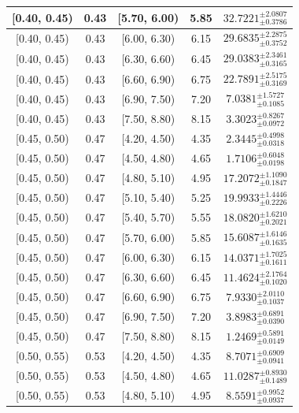 \begin{longtable}{|c|c|c|c|c|}
\hline
[0.40, 0.45) & 0.43 & [5.70, 6.00) & 5.85 & $32.7221^{ \pm 2.0807 }_{ \pm 0.3786 }$ \\ 
\hline
[0.40, 0.45) & 0.43 & [6.00, 6.30) & 6.15 & $29.6835^{ \pm 2.2875 }_{ \pm 0.3752 }$ \\ 
\hline
[0.40, 0.45) & 0.43 & [6.30, 6.60) & 6.45 & $29.0383^{ \pm 2.3461 }_{ \pm 0.3165 }$ \\ 
\hline
[0.40, 0.45) & 0.43 & [6.60, 6.90) & 6.75 & $22.7891^{ \pm 2.5175 }_{ \pm 0.3169 }$ \\ 
\hline
[0.40, 0.45) & 0.43 & [6.90, 7.50) & 7.20 & $7.0381^{ \pm 1.5727 }_{ \pm 0.1085 }$ \\ 
\hline
[0.40, 0.45) & 0.43 & [7.50, 8.80) & 8.15 & $3.3023^{ \pm 0.8267 }_{ \pm 0.0972 }$ \\ 
\hline
[0.45, 0.50) & 0.47 & [4.20, 4.50) & 4.35 & $2.3445^{ \pm 0.4998 }_{ \pm 0.0318 }$ \\ 
\hline
[0.45, 0.50) & 0.47 & [4.50, 4.80) & 4.65 & $1.7106^{ \pm 0.6048 }_{ \pm 0.0198 }$ \\ 
\hline
[0.45, 0.50) & 0.47 & [4.80, 5.10) & 4.95 & $17.2072^{ \pm 1.1090 }_{ \pm 0.1847 }$ \\ 
\hline
[0.45, 0.50) & 0.47 & [5.10, 5.40) & 5.25 & $19.9933^{ \pm 1.4446 }_{ \pm 0.2226 }$ \\ 
\hline
[0.45, 0.50) & 0.47 & [5.40, 5.70) & 5.55 & $18.0820^{ \pm 1.6210 }_{ \pm 0.2021 }$ \\ 
\hline
[0.45, 0.50) & 0.47 & [5.70, 6.00) & 5.85 & $15.6087^{ \pm 1.6146 }_{ \pm 0.1635 }$ \\ 
\hline
[0.45, 0.50) & 0.47 & [6.00, 6.30) & 6.15 & $14.0371^{ \pm 1.7025 }_{ \pm 0.1611 }$ \\ 
\hline
[0.45, 0.50) & 0.47 & [6.30, 6.60) & 6.45 & $11.4624^{ \pm 2.1764 }_{ \pm 0.1020 }$ \\ 
\hline
[0.45, 0.50) & 0.47 & [6.60, 6.90) & 6.75 & $7.9330^{ \pm 2.0110 }_{ \pm 0.1037 }$ \\ 
\hline
[0.45, 0.50) & 0.47 & [6.90, 7.50) & 7.20 & $3.8983^{ \pm 0.6891 }_{ \pm 0.0390 }$ \\ 
\hline
[0.45, 0.50) & 0.47 & [7.50, 8.80) & 8.15 & $1.2469^{ \pm 0.5891 }_{ \pm 0.0149 }$ \\ 
\hline
[0.50, 0.55) & 0.53 & [4.20, 4.50) & 4.35 & $8.7071^{ \pm 0.6909 }_{ \pm 0.0941 }$ \\ 
\hline
[0.50, 0.55) & 0.53 & [4.50, 4.80) & 4.65 & $11.0287^{ \pm 0.8930 }_{ \pm 0.1489 }$ \\ 
\hline
[0.50, 0.55) & 0.53 & [4.80, 5.10) & 4.95 & $8.5591^{ \pm 0.9952 }_{ \pm 0.0937 }$ \\ 

\end{longtable}

